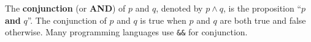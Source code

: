 %
%
%



\begin{df}
The {\bf conjunction} (or {\bf AND}) of $p$ and $q$,
denoted by \boldmath$p\wedge q$, is the proposition ``\boldmath$p$ {\bf and} \boldmath$q$''. 
The conjunction of $p$ and $q$
is true when $p$ and $q$ are both true and false otherwise.
Many programming languages use \verb+&&+ for conjunction.
\end{df}

